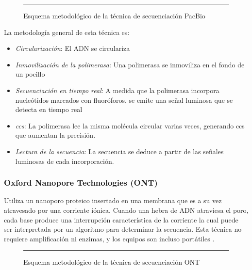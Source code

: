 \documentclass{AsignaturaResumen}
\begin{document}
\begin{figure}\centering
    \resizebox{\linewidth}{!}{}
    \rule{\linewidth}{0.5pt}
    \caption{Esquema metodológico de la técnica de secuenciación PacBio}
    \label{fig:esquema_secuenciacion_g3_pacific}
\end{figure}

La metodología general de esta técnica es:

\begin{itemize}
    \item \emph{Circularización}: El ADN se circulariza
    \item \emph{Inmovilización de la polimerasa}: Una polimerasa se inmoviliza en el fondo de un pocillo
    \item \emph{Secuenciación en tiempo real}: A medida que la polimerasa incorpora nucleótidos marcados con fluoróforos, se emite una señal luminosa que se detecta en tiempo real
    \item \emph{\acrfull{ccs}}: La polimerasa lee la misma molécula circular varias veces, generando \acrlong{ccs} que aumentan la precisión.
    \item \emph{Lectura de la secuencia}: La secuencia se deduce a partir de las señales luminosas de cada incorporación.
\end{itemize}

    



\FloatBarrier
\subsubsection{Oxford Nanopore Technologies (ONT)}\label{sec:oxford}

Utiliza un nanoporo proteico insertado en una membrana que es a su vez atravesado por una corriente iónica. Cuando una hebra de ADN atraviesa el poro, cada base produce una interrupción característica de la corriente la cual puede ser interpretada por un algoritmo para determinar la secuencia. Esta técnica no requiere amplificación ni enzimas, y los equipos son incluso portátiles \citep{erenDNASequencingMethods2022}.

\begin{figure}\centering
    \resizebox{\linewidth}{!}{}
    \rule{\linewidth}{0.5pt}
    \caption{Esquema metodológico de la técnica de secuenciación ONT}
    \label{fig:esquema_secuenciacion_g3_oxford}
\end{figure}
\end{document}
